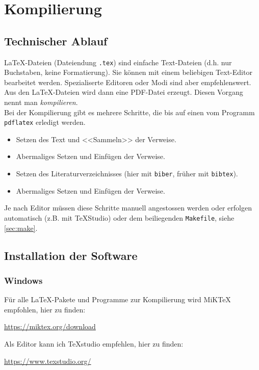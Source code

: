 \chapter{Kompilierung}\label{sec:compilieren}

\section{Technischer Ablauf}
\LaTeX-Dateien (Dateiendung \texttt{.tex})
sind einfache Text-Dateien (d.h. nur Buchstaben, keine
Formatierung). 
Sie können mit einem beliebigen Text-Editor bearbeitet werden.
Spezialiserte Editoren oder Modi sind aber empfehlenswert.\\
%
Aus den \LaTeX-Dateien wird dann eine PDF-Datei erzeugt.
Diesen Vorgang nennt man {\em kompilieren}.\\
%
Bei der Kompilierung gibt es mehrere Schritte, die bis auf einen
vom Programm \texttt{pdflatex} erledigt werden.
\begin{itemize}
	\item Setzen des Text und <<Sammeln>> der Verweise.
	\item Abermaliges Setzen und Einfügen der Verweise.
	\item Setzen des Literaturverzeichnisses 
		(hier mit \texttt{biber}, früher mit \texttt{bibtex}).
	\item Abermaliges Setzen und Einfügen der Verweise.
\end{itemize}
Je nach Editor müssen diese Schritte manuell angestossen werden
oder erfolgen automatisch (z.B. mit \TeX{}Studio) oder dem 
beiliegenden \texttt{Makefile}, siehe \autoref{sec:make}.

\section{Installation der Software}

\subsection{Windows}\label{sec:windows}
Für alle \LaTeX{}-Pakete und Programme zur Kompilierung wird
MiK\TeX{} empfohlen, hier zu finden:
\begin{center}
\url{https://miktex.org/download}
\end{center}

\noindent Als Editor kann ich \TeX{}studio empfehlen, hier zu finden:

\begin{center}
\url{https://www.texstudio.org/}
\end{center}

